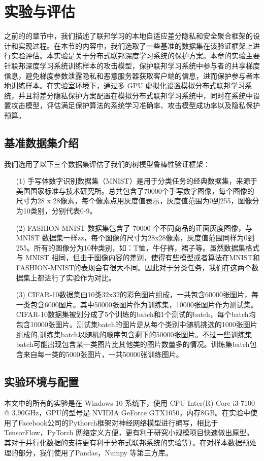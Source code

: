 \chapter{实验与评估}
\label{ch5}
之前的的章节中，我们描述了联邦学习的本地自适应差分隐私和安全聚合框架的设计和实现过程。在本节的内容中，我们选取了一些基准的数据集在该验证框架上进行实验评估。本实验是关于分布式联邦深度学习系统的保护方案。本章的实验主要针联邦深度学习系统训练样本的攻击模型，保护联邦学习系统中参与者的共享梯度信息，避免梯度参数泄露隐私和恶意服务器获取客户端的信息，进而保护参与者本地训练样本。在实验室环境下，通过多 GPU 虚拟化设置模拟分布式联邦学习系统，并且将差分隐私保护方案配置在模拟分布式联邦学习系统中，同时在系统中设置攻击模型，评估满足保护算法的系统学习准确率、攻击模型成功率以及隐私保护预算。 
\section{基准数据集介绍}
我们选用了以下三个数据集评估了我们的树模型鲁棒性验证框架：
\begin{enumerate}
	\item [(1)] 手写体数字识别数据集（MNIST）是用于分类任务的经典数据集，来源于美国国家标准与技术研究所。总共包含了70000个手写数字图像，每个图像的尺寸为28 x 28像素，每个像素点用灰度值表示，灰度值范围为0到255，图像分为10类别，分别代表0-9。
	\item [(2)] FASHION-MNIST 数据集包含了 70000 个不同商品的正面灰度图像，与 MNIST 数据集一样zz，每个图像的尺寸为28x28像素，灰度值范围同样为0到255。所有的图像分为10种类别，如：T恤，牛仔裤，裙子等。虽然数据集格式与 MNIST 相同，但由于图像内容的差别，使得有些模型或者算法在MNIST和FASHION-MNIST的表现会有很大不同。因此对于分类任务，我们在这两个数据集上都进行了实验作为对比。
	\item [(3)] CIFAR-10数据集由10类32x32的彩色图片组成，一共包含60000张图片，每一类包含6000图片。其中50000张图片作为训练集，10000张图片作为测试集。CIFAR-10数据集被划分成了5个训练的batch和1个测试的batch，每个batch均包含10000张图片。测试集batch的图片是从每个类别中随机挑选的1000张图片组成的,训练集batch以随机的顺序包含剩下的50000张图片。不过一些训练集batch可能出现包含某一类图片比其他类的图片数量多的情况。训练集batch包含来自每一类的5000张图片，一共50000张训练图片。


\end{enumerate}

\section{实验环境与配置}
本文中的所有的实验是在 Windows 10 系统下，使用 CPU Inter(R) Core i3-7100 @ 3.90GHz，GPU的型号是 NVIDIA GeForce GTX1050，内存8GB。在实验中使用了Facebook公司的Pythorch框架对神经网络模型进行编写，相比于TensorFlow，PyTorch 网络定义方便，更有利于研究小规模项目快速做出原型。其对于并行化数据的支持更有利于分布式联邦系统的实验等）。在对样本数据预处理的部分，我们使用了Pandas，Numpy 等第三方库。

